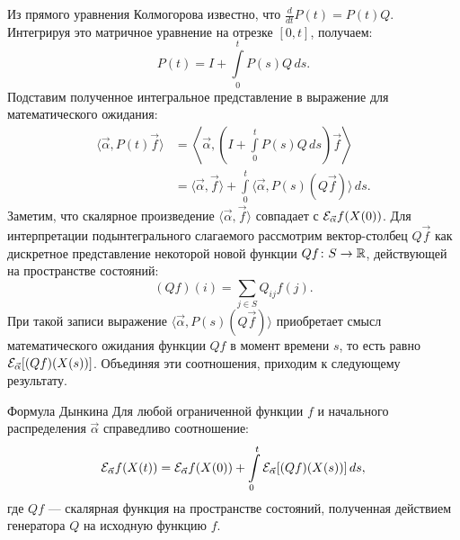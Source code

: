 Из прямого уравнения Колмогорова известно, что $\frac{d}{dt}P(t) = P(t) Q$. Интегрируя это матричное уравнение на отрезке $[0, t]$, получаем:
\[
    P(t) = I + \int\limits_0^t P(s) Q \, ds.
\]
Подставим полученное интегральное представление в выражение для математического ожидания:
\begin{align*}
    \langle \vec{\alpha}, P(t) \vec{f} \rangle &= \left\langle \vec{\alpha}, \left( I + \int\limits_0^t P(s) Q \, ds \right) \vec{f} \right\rangle \\
    &= \langle \vec{\alpha}, \vec{f} \rangle + \int\limits_0^t \langle \vec{\alpha}, P(s) (Q \vec{f}) \rangle \, ds.
\end{align*}
Заметим, что скалярное произведение $\langle \vec{\alpha}, \vec{f} \rangle$ совпадает с $\mathcal{E}_{\vec{\alpha}} f(X(0))$. Для интерпретации подынтегрального слагаемого рассмотрим вектор-столбец $Q \vec{f}$ как дискретное представление некоторой новой функции $Qf \colon S \to \mathbb{R}$, действующей на пространстве состояний:
\[
    (Qf)(i) = \sum_{j \in S} Q_{ij} f(j).
\]
При такой записи выражение $\langle \vec{\alpha}, P(s) (Q \vec{f}) \rangle$ приобретает смысл математического ожидания функции $Qf$ в момент времени $s$, то есть равно $\mathcal{E}_{\vec{\alpha}} [(Qf)(X(s))]$. Объединяя эти соотношения, приходим к следующему результату.

\begin{theorem}{Формула Дынкина}
    Для любой ограниченной функции $f$ и начального распределения $\vec{\alpha}$ справедливо соотношение:
    \[
        \mathcal{E}_{\vec{\alpha}} f(X(t)) = \mathcal{E}_{\vec{\alpha}} f(X(0)) + \int\limits_0^t \mathcal{E}_{\vec{\alpha}} [(Qf)(X(s))] \, ds,
    \]
    где $Qf$ — скалярная функция на пространстве состояний, полученная действием генератора $Q$ на исходную функцию $f$.
\end{theorem}

